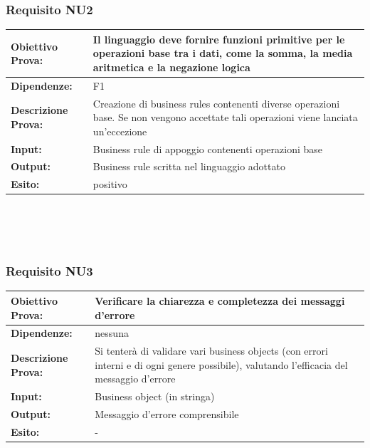 \documentclass[11pt,titlepage,a4paper]{report}
\begin{document}
\subsubsection{Requisito NU2}
\begin{tabular}{||p{4.5cm}||p{7.5cm}||}
\hline
{\textbf {Obiettivo Prova:}}& Il linguaggio deve fornire funzioni primitive per le operazioni base tra i dati, come la somma, la media aritmetica e la negazione logica \\ \hline
{\textbf{Dipendenze:}}& F1 \\ \hline
{\textbf{Descrizione Prova:}}&  Creazione di business rules contenenti diverse operazioni base. Se non vengono accettate tali operazioni viene lanciata un'eccezione \\ \hline
{\textbf{Input:}}&  Business rule di appoggio contenenti operazioni base \\ \hline
{\textbf{Output:}}& Business rule scritta nel linguaggio adottato \\ \hline
{\textbf{Esito:}}& positivo\\ \hline
\end{tabular} \\
\\
\\
\subsubsection{Requisito NU3}
\begin{tabular}{||p{4.5cm}||p{7.5cm}||}
\hline
{\textbf{Obiettivo Prova:}}& Verificare la chiarezza e completezza dei messaggi d'errore\\ \hline
{\textbf{Dipendenze:}}& nessuna \\ \hline
{\textbf{Descrizione Prova:}}& Si tenter\`a di validare vari business objects (con errori interni e di ogni genere possibile), valutando l'efficacia del messaggio d'errore \\ \hline
{\textbf{Input:}}&  Business object (in stringa) \\ \hline %
{\textbf{Output:}}& Messaggio d'errore comprensibile \\ \hline
{\textbf{Esito:}}& - \\ \hline
\end{tabular} \\
\\
\\
\end{document}
